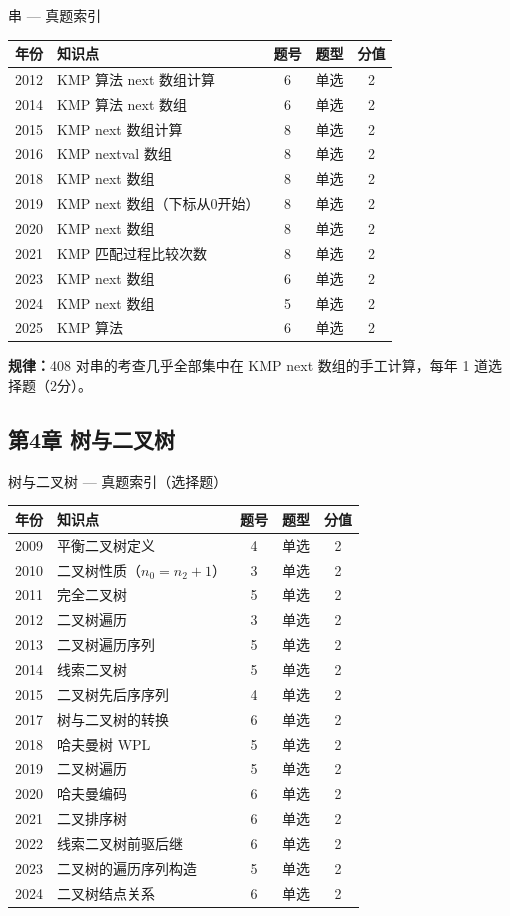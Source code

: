 \begin{tablebox}{串 — 真题索引}
\centering
\begin{tabular}{|c|l|c|c|c|}
\hline
年份 & 知识点 & 题号 & 题型 & 分值 \\
\hline
2012 & KMP 算法 next 数组计算 & 6 & 单选 & 2 \\
2014 & KMP 算法 next 数组 & 6 & 单选 & 2 \\
2015 & KMP next 数组计算 & 8 & 单选 & 2 \\
2016 & KMP nextval 数组 & 8 & 单选 & 2 \\
2018 & KMP next 数组 & 8 & 单选 & 2 \\
2019 & KMP next 数组（下标从0开始）& 8 & 单选 & 2 \\
2020 & KMP next 数组 & 8 & 单选 & 2 \\
2021 & KMP 匹配过程比较次数 & 8 & 单选 & 2 \\
2023 & KMP next 数组 & 6 & 单选 & 2 \\
2024 & KMP next 数组 & 5 & 单选 & 2 \\
2025 & KMP 算法 & 6 & 单选 & 2 \\
\hline
\end{tabular}
\end{tablebox}

\noindent\textbf{规律：}408 对串的考查几乎全部集中在 KMP next 数组的手工计算，每年 1 道选择题（2分）。

\subsection*{第4章 树与二叉树}

\begin{tablebox}{树与二叉树 — 真题索引（选择题）}
\centering
\begin{tabular}{|c|l|c|c|c|}
\hline
年份 & 知识点 & 题号 & 题型 & 分值 \\
\hline
2009 & 平衡二叉树定义 & 4 & 单选 & 2 \\
2010 & 二叉树性质（$n_0=n_2+1$）& 3 & 单选 & 2 \\
2011 & 完全二叉树 & 5 & 单选 & 2 \\
2012 & 二叉树遍历 & 3 & 单选 & 2 \\
2013 & 二叉树遍历序列 & 5 & 单选 & 2 \\
2014 & 线索二叉树 & 5 & 单选 & 2 \\
2015 & 二叉树先后序序列 & 4 & 单选 & 2 \\
2017 & 树与二叉树的转换 & 6 & 单选 & 2 \\
2018 & 哈夫曼树 WPL & 5 & 单选 & 2 \\
2019 & 二叉树遍历 & 5 & 单选 & 2 \\
2020 & 哈夫曼编码 & 6 & 单选 & 2 \\
2021 & 二叉排序树 & 6 & 单选 & 2 \\
2022 & 线索二叉树前驱后继 & 6 & 单选 & 2 \\
2023 & 二叉树的遍历序列构造 & 5 & 单选 & 2 \\
2024 & 二叉树结点关系 & 6 & 单选 & 2 \\
\hline
\end{tabular}
\end{tablebox}

